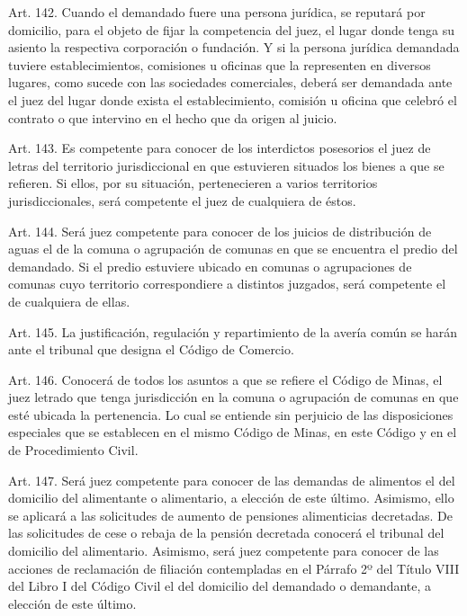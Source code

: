     Art. 142. Cuando el demandado fuere una persona jurídica, se reputará por domicilio, para el objeto de fijar la competencia del juez, el lugar donde tenga su asiento la respectiva corporación o fundación.
    Y si la persona jurídica demandada tuviere establecimientos, comisiones u oficinas que la representen en diversos lugares, como sucede con las sociedades comerciales, deberá ser demandada ante el juez del lugar donde exista el establecimiento, comisión u oficina que celebró el contrato o que intervino en el hecho que da origen al juicio.


    Art. 143. Es competente para conocer de los interdictos posesorios el juez de letras del territorio jurisdiccional en que estuvieren situados los bienes a que se refieren. Si ellos, por su situación, pertenecieren a varios territorios jurisdiccionales, será competente el juez de cualquiera de éstos.



    Art. 144. Será juez competente para conocer de los juicios de distribución de aguas el de la comuna o agrupación de comunas en que se encuentra el predio del demandado. Si el predio estuviere ubicado en comunas o agrupaciones de comunas cuyo territorio correspondiere a distintos juzgados, será competente el de cualquiera de ellas.


    Art. 145. La justificación, regulación y repartimiento de la avería común se harán ante el tribunal que designa el Código de Comercio.

    Art. 146. Conocerá de todos los asuntos a que se refiere el Código de Minas, el juez letrado que tenga jurisdicción en la comuna o agrupación de comunas en que esté ubicada la pertenencia. Lo cual se entiende sin perjuicio de las disposiciones especiales que se establecen en el mismo Código de Minas, en este Código y en el de Procedimiento Civil.



    Art. 147. Será juez competente para conocer de las demandas de alimentos el del domicilio del alimentante o alimentario, a elección de este último. Asimismo, ello se aplicará a las solicitudes de aumento de pensiones alimenticias decretadas.
    De las solicitudes de cese o rebaja de la pensión decretada conocerá el tribunal del domicilio del alimentario.
    Asimismo, será juez competente para conocer de las acciones de reclamación de filiación contempladas en el Párrafo 2º del Título VIII del Libro I del Código Civil el del domicilio del demandado o demandante, a elección de este último.



